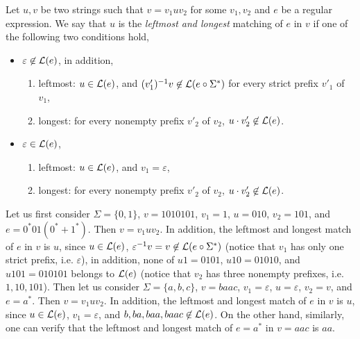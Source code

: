 \begin{definition}
Let $u, v$ be two strings such that $v = v_1 u v_2$ for some $v_1,v_2$ and $e$ be a regular expression. We say that $u$ is the \emph{leftmost and longest} matching of $e$ in $v$ if one of the following two conditions hold,
\begin{itemize}
\item $\varepsilon \not \in \mathcal{L}(e)$, in addition, 
\begin{enumerate}
	\item leftmost: $u \in \mathcal{L}(e)$,  and $(v'_1)^{-1} v \not \in  \mathcal{L}(e \circ \Sigma^*)$ for every strict prefix $v'_1$ of $v_1$, 
	\item longest: for every nonempty prefix $v'_2$ of $v_2$, $u \cdot v'_2 \not \in \mathcal{L}(e)$.
\end{enumerate} 
%
\item $\varepsilon \in \mathcal{L}(e)$, 
\begin{enumerate}
	\item leftmost: $u \in \mathcal{L}(e)$, and $v_1 = \varepsilon$, 
	\item longest: for every nonempty prefix $v'_2$ of $v_2$, $u \cdot v'_2 \not \in \mathcal{L}(e)$.
\end{enumerate} 
\end{itemize}
\end{definition}


\begin{example}
Let us first consider $\Sigma = \{0,1\}$, $v=1010101$, $v_1 =1$, $u = 010$, $v_2 = 101$, and $e = 0^*01(0^*+ 1^*)$. Then $v= v_1 u v_2$. In addition, the leftmost and longest match of $e$ in $v$ is $u$, since $u \in \mathcal{L}(e)$, $\varepsilon^{-1} v = v \not \in \mathcal{L}(e \circ \Sigma^*)$ (notice that $v_1$ has only one strict prefix, i.e. $\varepsilon$), in addition, none of $u 1=0101$, $u 10=01010$, and $u101=010101$ belongs to $\mathcal{L}(e)$ (notice that $v_2$ has three nonempty prefixes, i.e. $1,10,101$). Then let us consider $\Sigma = \{a,b,c\}$, $v=baac$, $v_1 = \varepsilon$, $u =\varepsilon$, $v_2 = v$, and $e = a^*$. Then $v = v_1 u v_2$. In addition, the leftmost and longest match of $e$ in $v$ is $u$, since $u \in \mathcal{L}(e)$, $v_1 = \varepsilon$, and $b, ba, baa, baac \not \in \mathcal{L}(e)$. On the other hand, similarly, one can verify that the leftmost and longest match of $e=a^*$ in $v=aac$ is $aa$.
\end{example}

